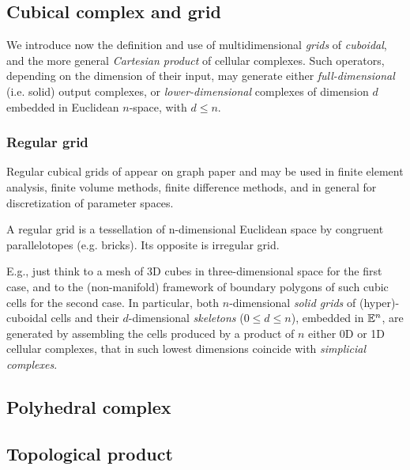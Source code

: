 \subsection{Cubical complex and grid}\label{sect:3-2-2}


We introduce now the definition and use of multidimensional \emph{grids} of \emph{cuboidal}, and the more general \emph{Cartesian product} of cellular complexes. Such operators, depending on the dimension of their input, may generate either \emph{full-dimensional} (i.e. solid) output complexes, or \emph{lower-dimensional} complexes of dimension $d$ embedded in Euclidean $n$-space, with $d\leq n$.  

\subsubsection*{Regular grid}


Regular cubical grids of appear on graph paper and may be used in finite element analysis, finite volume methods, finite difference methods, and in general for discretization of parameter spaces. 

\begin{definition} A regular grid is a tessellation of n-dimensional Euclidean space by congruent parallelotopes (e.g. bricks). Its opposite is irregular grid.
\end{definition}

E.g., just think to a mesh of 3D cubes in three-dimensional space for the first case, and to the (non-manifold) framework of boundary polygons of such cubic cells for the second case.
In particular,  both $n$-dimensional \emph{solid grids} of (hyper)-cuboidal cells and their  $d$-dimensional \emph{skeletons} ($0\leq d\leq n$), embedded in $\mathbb{E}^n$, are generated by assembling the cells produced by a product of $n$ either 0D or 1D cellular complexes, that in such lowest dimensions coincide with \emph{simplicial complexes}. 







\subsection{Polyhedral complex}\label{sect:3-2-3}


\subsection{Topological product}
\label{subsec:2:style}

